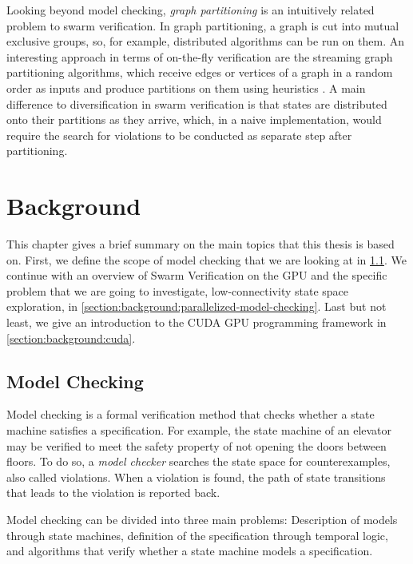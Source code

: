 \documentclass[
fancyheadings, %
%
%
]{stsreprt}
\begin{document}
Looking beyond model checking, \emph{graph partitioning} is an intuitively related problem to swarm verification.
In graph partitioning, a graph is cut into mutual exclusive groups, so, for example, distributed algorithms can be run on them.
An interesting approach in terms of on-the-fly verification are the streaming graph partitioning algorithms, which receive edges or vertices of a graph in a random order as inputs and produce partitions on them using heuristics \cite{Stanton2012}.
A main difference to diversification in swarm verification is that states are distributed onto their partitions as they arrive, which, in a naive implementation, would require the search for violations to be conducted as separate step after partitioning.

\chapter{Background}
\label{chapter:background}

This chapter gives a brief summary on the main topics that this thesis is based on.
First, we define the scope of model checking that we are looking at in \cref{section:background:model-checking}.
We continue with an overview of Swarm Verification on the GPU and the specific problem that we are going to investigate, low-connectivity state space exploration, in \cref{section:background:parallelized-model-checking}.
Last but not least, we give an introduction to the CUDA GPU programming framework in \cref{section:background:cuda}.

\section{Model Checking}
\label{section:background:model-checking}

Model checking is a formal verification method that checks whether a state machine satisfies a specification.
For example, the state machine of an elevator may be verified to meet the safety property of not opening the doors between floors.
To do so, a \emph{model checker} searches the state space for counterexamples, also called violations.
When a violation is found, the path of state transitions that leads to the violation is reported back.

Model checking can be divided into three main problems:
Description of models through state machines, definition of the specification through temporal logic, and algorithms that verify whether a state machine models a specification.
\end{document}
